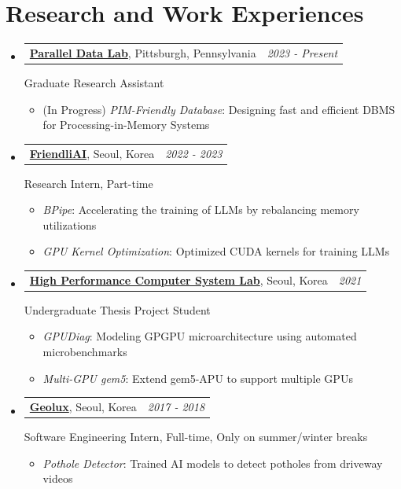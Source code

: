 \documentclass[a4paper]{article}
\makeatletter
\newcommand{\resumeSubheading}[4]{
  \vspace{-1pt}\item
    \begin{tabular*}{0.97\textwidth}{l@{\extracolsep{\fill}}r}
      \textbf{#1}, #2 & \textit{#3} \\
    \end{tabular*}
    #4
}
\newcommand{\resumeSubHeadingListStart}{\begin{itemize}[leftmargin=*]}
\newcommand{\resumeSubHeadingListEnd}{\end{itemize}}
\makeatother
\begin{document}
\section{Research and Work Experiences}
\resumeSubHeadingListStart
	\resumeSubheading
		{\href{https://pdl.cmu.edu/index.shtml}{Parallel Data Lab}}{Pittsburgh, Pennsylvania}{2023 - Present}
		{
			Graduate Research Assistant
			\vspace{-5pt}
			\begin{itemize}
				\item {(In Progress) \textit{PIM-Friendly Database}: Designing fast and efficient DBMS for Processing-in-Memory Systems}
			\end{itemize}
		}
	\resumeSubheading
		{\href{https://friendli.ai}{FriendliAI}}{Seoul, Korea}{2022 - 2023}
		{
			Research Intern, Part-time
			\vspace{-5pt}
			\begin{itemize}
				\item {\textit{BPipe}: Accelerating the training of LLMs by rebalancing memory utilizations}
				\item {\textit{GPU Kernel Optimization}: Optimized CUDA kernels for training LLMs}
			\end{itemize}
		}
	\resumeSubheading
		{\href{https://hpcs.snu.ac.kr/}{High Performance Computer System Lab}}{Seoul, Korea}{2021}
		{
			Undergraduate Thesis Project Student
			\begin{itemize}
				\item {\textit{GPUDiag}: Modeling GPGPU microarchitecture using automated microbenchmarks}
				\item {\textit{Multi-GPU gem5}: Extend gem5-APU to support multiple GPUs}
			\end{itemize}
		}
	\resumeSubheading
		{\href{http://www.geolux.co.kr/en/}{Geolux}}{Seoul, Korea}{2017 - 2018}
		{
			Software Engineering Intern, Full-time, Only on summer/winter breaks
			\vspace{-5pt}
			\begin{itemize}
				\item {\textit{Pothole Detector}: Trained AI models to detect potholes from driveway videos}
			\end{itemize}
		}
\resumeSubHeadingListEnd
\end{document}
